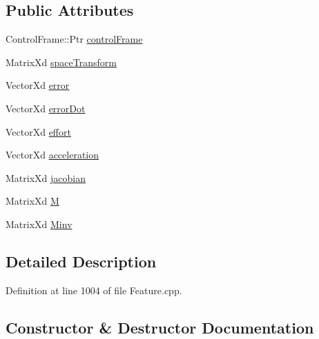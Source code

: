 \subsection*{Public Attributes}
\begin{DoxyCompactItemize}
\item 
Control\+Frame\+::\+Ptr \hyperlink{structocra_1_1ContactConstraintFeature_1_1Pimpl_a5494b44c1948a8ad255b266b216ab04f}{control\+Frame}
\item 
Matrix\+Xd \hyperlink{structocra_1_1ContactConstraintFeature_1_1Pimpl_a3b33ee6094ed308df598785b4a75416c}{space\+Transform}
\item 
Vector\+Xd \hyperlink{structocra_1_1ContactConstraintFeature_1_1Pimpl_a00ed1a9962ef8b48ed816d4f3f39394b}{error}
\item 
Vector\+Xd \hyperlink{structocra_1_1ContactConstraintFeature_1_1Pimpl_a43821a1f06ddd5af36588e84def45897}{error\+Dot}
\item 
Vector\+Xd \hyperlink{structocra_1_1ContactConstraintFeature_1_1Pimpl_af9482cf46b3e6e4e44c3244b63d899c5}{effort}
\item 
Vector\+Xd \hyperlink{structocra_1_1ContactConstraintFeature_1_1Pimpl_abbd60c31e91c03722e770e7a65890599}{acceleration}
\item 
Matrix\+Xd \hyperlink{structocra_1_1ContactConstraintFeature_1_1Pimpl_ab7a5dfed0b05f6871bad4fcf61d7e998}{jacobian}
\item 
Matrix\+Xd \hyperlink{structocra_1_1ContactConstraintFeature_1_1Pimpl_a2de0104acc90d7ef05e0b5d5c6142ed5}{M}
\item 
Matrix\+Xd \hyperlink{structocra_1_1ContactConstraintFeature_1_1Pimpl_afa7af0eb036037f47dfa1b93c02cd3d5}{Minv}
\end{DoxyCompactItemize}


\subsection{Detailed Description}


Definition at line 1004 of file Feature.\+cpp.



\subsection{Constructor \& Destructor Documentation}
\hypertarget{structocra_1_1ContactConstraintFeature_1_1Pimpl_a59ec46b69968b06c7e858234acccd990}{}\label{structocra_1_1ContactConstraintFeature_1_1Pimpl_a59ec46b69968b06c7e858234acccd990} 
